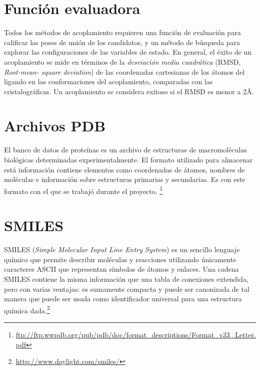 \section{Función evaluadora}
Todos los métodos de acoplamiento requieren una función de evaluación
para calificar las poses de unión de los candidatos, y un método de
búsqueda para explorar las configuraciones de las variables de
estado. En general, el éxito de un acoplamiento se mide en términos de
la \textit{desviación media cuadrática} (RMSD, \textit{Root-mean-
square deviation}) de las coordenadas cartesianas de los átomos del
ligando en las conformaciones del acoplamiento, comparadas con las
cristalográficas. Un acoplamiento se considera exitoso si el RMSD es
menor a 2\AA.

\section{Archivos PDB}
El banco de datos de proteínas es un archivo de estructuras de
macromoléculas biológicas determinadas experimentalmente. El formato
utilizado para almacenar está información contiene elementos como
coordenadas de átomos, nombres de moléculas e información sobre
estructuras primarias y secundarias. Es con este formato con el que se
trabajó durante el proyecto.
\footnote{\url{ftp://ftp.wwpdb.org/pub/pdb/doc/format_descriptions/Format_v33_Letter.pdf}}

\section{SMILES}
SMILES (\textit{Simple Molecular Input Line Entry System}) es un
sencillo lenguaje químico que permite describir moléculas y reacciones
utilizando únicamente caracteres ASCII que representan símbolos de
átomos y enlaces. Una cadena SMILES contiene la misma información que
una tabla de conexiones extendida, pero con varias ventajas: es
sumamente compacta y puede ser canonizada de tal manera que puede ser
usada como identificador universal para una estructura química
dada.\footnote{\url{http://www.daylight.com/smiles/}}
